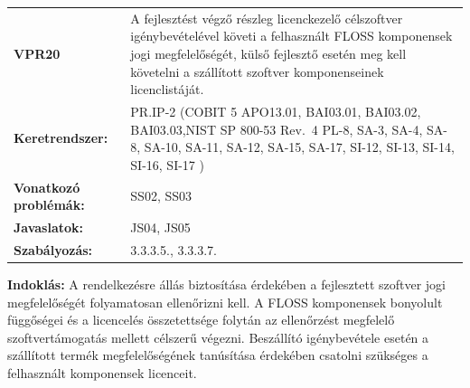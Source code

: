 \documentclass[12pt,magyar,a4paper,oneside]{scrreprt}
\begin{document}
\begin{longtable}[]{@{}ll@{}}
\toprule
\endhead
\begin{minipage}[t]{0.16\columnwidth}\raggedright
\textbf{VPR20}\strut
\end{minipage} & \begin{minipage}[t]{0.79\columnwidth}\raggedright
A fejlesztést végző részleg licenckezelő célszoftver igénybevételével
követi a felhasznált FLOSS komponensek jogi megfelelőségét, külső
fejlesztő esetén meg kell követelni a szállított szoftver komponenseinek
licenclistáját.\strut
\end{minipage}\tabularnewline
\begin{minipage}[t]{0.16\columnwidth}\raggedright
\textbf{Keretrendszer:}\strut
\end{minipage} & \begin{minipage}[t]{0.79\columnwidth}\raggedright
PR.IP-2 (COBIT 5 APO13.01, BAI03.01, BAI03.02, BAI03.03,NIST SP 800-53
Rev.~4 PL-8, SA-3, SA-4, SA-8, SA-10, SA-11, SA-12, SA-15, SA-17, SI-12,
SI-13, SI-14, SI-16, SI-17 )\strut
\end{minipage}\tabularnewline
\begin{minipage}[t]{0.16\columnwidth}\raggedright
\textbf{Vonatkozó problémák:}\strut
\end{minipage} & \begin{minipage}[t]{0.79\columnwidth}\raggedright
SS02, SS03\strut
\end{minipage}\tabularnewline
\begin{minipage}[t]{0.16\columnwidth}\raggedright
\textbf{Javaslatok:}\strut
\end{minipage} & \begin{minipage}[t]{0.79\columnwidth}\raggedright
JS04, JS05\strut
\end{minipage}\tabularnewline
\begin{minipage}[t]{0.16\columnwidth}\raggedright
\textbf{Szabályozás:}\strut
\end{minipage} & \begin{minipage}[t]{0.79\columnwidth}\raggedright
3.3.3.5., 3.3.3.7.\strut
\end{minipage}\tabularnewline
\bottomrule
\end{longtable}

\textbf{Indoklás: } A rendelkezésre állás biztosítása érdekében a
fejlesztett szoftver jogi megfelelőségét folyamatosan ellenőrizni kell.
A FLOSS komponensek bonyolult függőségei és a licencelés összetettsége
folytán az ellenőrzést megfelelő szoftvertámogatás mellett célszerű
végezni. Beszállító igénybevétele esetén a szállított termék
megfelelőségének tanúsítása érdekében csatolni szükséges a felhasznált
komponensek licenceit.
\end{document}
